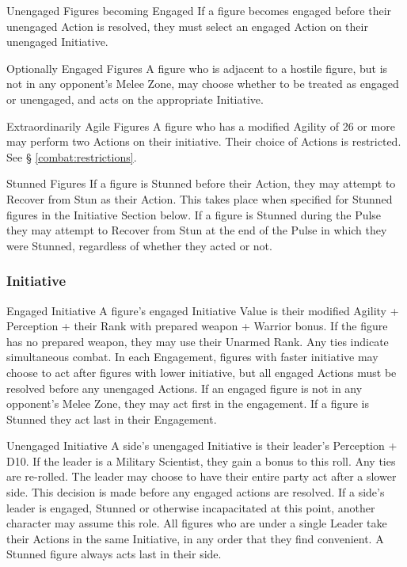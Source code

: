 \begin{multicols*}{3}
\begin{Description}
\item[Unengaged Figures becoming Engaged] If a figure becomes engaged
before their unengaged Action is resolved, they must select an engaged
Action on their unengaged Initiative.

\item[Optionally Engaged Figures] A figure who is adjacent to a
hostile figure, but is not in any opponent's Melee Zone, may choose
whether to be treated as engaged or unengaged, and acts on the
appropriate Initiative.

\item[Extraordinarily Agile Figures] A figure who has a modified
Agility of 26 or more may perform two Actions on their
initiative. Their choice of Actions is restricted. See \S
\ref{combat:restrictions}.

\item[Stunned Figures] If a figure is Stunned before their Action, they
may attempt to Recover from Stun as their Action.  This takes place
when specified for Stunned figures in the Initiative Section below.
If a figure is Stunned during the Pulse they may attempt to Recover
from Stun at the end of the Pulse in which they were Stunned, regardless
of whether they acted or not.

\end{Description}

\subsubsection{Initiative}
\label{combat:initiative}
\begin{Description}
\item[Engaged Initiative] A figure's engaged Initiative Value is their
modified Agility + Perception + their Rank with prepared weapon +
Warrior bonus. If the figure has no prepared weapon, they may use
their Unarmed Rank. Any ties indicate simultaneous combat. In each
Engagement, figures with faster initiative may choose to act after
figures with lower initiative, but all engaged Actions must be
resolved before any unengaged Actions. If an engaged figure is not in
any opponent's Melee Zone, they may act first in the engagement. If a
figure is Stunned they act last in their Engagement.

\item[Unengaged Initiative] A side's unengaged Initiative is their
leader's Perception + D10. If the leader is a Military Scientist, they
gain a bonus to this roll. Any ties are re-rolled. The leader may
choose to have their entire party act after a slower side. This
decision is made before any engaged actions are resolved. If a side's
leader is engaged, Stunned or otherwise incapacitated at this point,
another character may assume this role.  All figures who are under a
single Leader take their Actions in the same Initiative, in any order
that they find convenient.  A Stunned figure always acts last in their
side.


\end{Description}
\end{multicols*}
